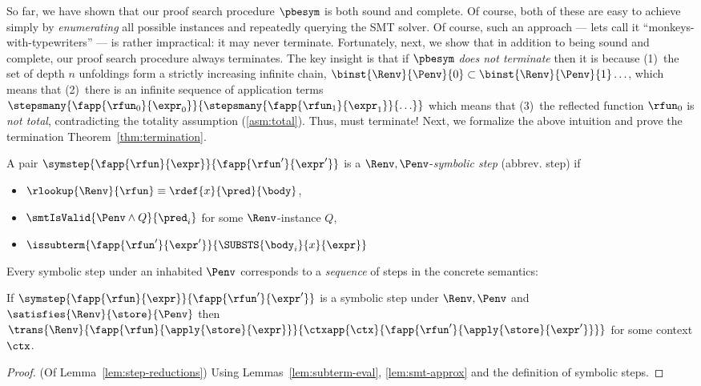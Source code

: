 So far, we have shown that our proof search
procedure $\pbesym$ is both sound and complete.
%
Of course, both of these are easy to achieve
simply by \emph{enumerating} all possible
instances and repeatedly querying the SMT
solver.
%
Of course, such an approach --- lets call it
``monkeys-with-typewriters'' --- is rather
impractical: it may never terminate.
%
Fortunately, next, we show that in addition
to being sound and complete, our proof search
procedure always terminates.
%
The key insight is that if $\pbesym$ \emph{does not terminate}
then it is because
%
(1)~the set of depth $n$ unfoldings form a strictly
    increasing infinite chain,
    $\binst{\Renv}{\Penv}{0} \subset \binst{\Renv}{\Penv}{1} \ldots$,
    which means that
(2)~there is an infinite sequence of application terms
    $\stepsmany{\fapp{\rfun_0}{\expr_0}}{\stepsmany{\fapp{\rfun_1}{\expr_1}}{\ldots}}$
    which means that
(3)~the reflected function $\rfun_0$ is \emph{not total}, contradicting the
    totality assumption (\ref{asm:total}).
%
Thus, \pbesym must terminate!
%
Next, we formalize the above intuition and
prove the termination Theorem~\ref{thm:termination}.

%
A pair
$\symstep{\fapp{\rfun}{\expr}}{\fapp{\rfun'}{\expr'}}$
is a
$\Renv,\Penv$-\emph{symbolic step} (abbrev. step)
if
%
\begin{itemize}
  \item $\rlookup{\Renv}{\rfun} \equiv \rdef{x}{\pred}{\body}$,
  \item $\smtIsValid{\Penv \wedge Q}{\pred_i}$ for some $\Renv$-instance $Q$,
  \item $\issubterm{\fapp{\rfun'}{\expr'}}{\SUBSTS{\body_i}{x}{\expr}}$
\end{itemize}

%
Every symbolic step under an inhabited $\Penv$ corresponds
to a \emph{sequence} of steps in the concrete semantics:

\begin{lemma}\label{lem:step-reductions}
If   $\symstep{\fapp{\rfun}{\expr}}{\fapp{\rfun'}{\expr'}}$
     is a symbolic step under $\Renv, \Penv$
     and
     $\satisfies{\Renv}{\store}{\Penv}$
then $\trans{\Renv}
            {\fapp{\rfun}{\apply{\store}{\expr}}}
            {\ctxapp{\ctx}{\fapp{\rfun'}{\apply{\store}{\expr'}}}}$
for some context $\ctx$.
\end{lemma}

\begin{proof} (Of Lemma~\ref{lem:step-reductions})
Using Lemmas~\ref{lem:subterm-eval}, \ref{lem:smt-approx}
and the definition of symbolic steps.
\end{proof}

